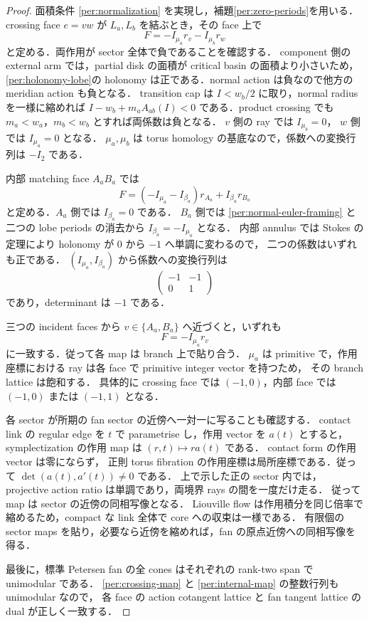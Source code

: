 \begin{proof}
面積条件 \eqref{per:normalization} を実現し，補題\ref{per:zero-periods}を用いる．
crossing face $e=vw$ が $L_a,L_b$ を結ぶとき，その face 上で
\begin{equation}\label{per:crossing-map}
 F=-I_{\mu_a}r_v-I_{\mu_b}r_w
\end{equation}
と定める．両作用が sector 全体で負であることを確認する．
component 側の external arm では，partial disk の面積が critical basin の面積より小さいため，
\eqref{per:holonomy-lobe}の holonomy は正である．normal action は負なので他方の meridian action も負となる．
transition cap は $I<w_b/2$ に取り，normal radius を一様に縮めれば
$I-w_b+m_a A_{ab}(I)<0$ である．product crossing でも $m_a<w_a$，$m_b<w_b$ とすれば両係数は負となる．
$v$ 側の ray では $I_{\mu_b}=0$，
$w$ 側では $I_{\mu_a}=0$ となる．
$\mu_a,\mu_b$ は torus homology の基底なので，係数への変換行列は $-I_2$ である．

内部 matching face $A_aB_a$ では
\begin{equation}\label{per:internal-map}
 F=(-I_{\mu_a}-I_{\beta_a})r_{A_a}+I_{\beta_a}r_{B_a}
\end{equation}
と定める．$A_a$ 側では $I_{\beta_a}=0$ である．
$B_a$ 側では \eqref{per:normal-euler-framing} と二つの lobe periods の消去から
$I_{\beta_a}=-I_{\mu_a}$ となる．
内部 annulus では Stokes の定理により holonomy が $0$ から $-1$ へ単調に変わるので，
二つの係数はいずれも正である．
$(I_{\mu_a},I_{\beta_a})$ から係数への変換行列は
\[
 \begin{pmatrix}-1&-1\\0&1\end{pmatrix}
\]
であり，determinant は $-1$ である．

三つの incident faces から $v\in\{A_a,B_a\}$ へ近づくと，いずれも
\begin{equation}\label{per:common-ray}
 F=-I_{\mu_a}r_v
\end{equation}
に一致する．従って各 map は branch 上で貼り合う．
$\mu_a$ は primitive で，作用座標における ray は各 face で primitive integer vector を持つため，
その branch lattice は飽和する．
具体的に crossing face では $(-1,0)$，内部 face では $(-1,0)$ または $(-1,1)$ となる．

各 sector が所期の fan sector の近傍へ一対一に写ることも確認する．
contact link の regular edge を $t$ で parametrise し，作用 vector を $a(t)$ とすると，
symplectization の作用 map は $(r,t)\mapsto r a(t)$ である．
contact form の作用 vector は零にならず\cite[Remark 2.11]{EM}，
正則 torus fibration の作用座標は局所座標である．従って
$\det(a(t),a'(t))\ne0$ である．
上で示した正の sector 内では，projective action ratio は単調であり，両境界 rays の間を一度だけ走る．
従って map は sector の近傍の同相写像となる．
Liouville flow は作用積分を同じ倍率で縮めるため，compact な link 全体で core への収束は一様である．
有限個の sector maps を貼り，必要なら近傍を縮めれば，fan の原点近傍への同相写像を得る．

最後に，標準 Petersen fan の全 cones はそれぞれの rank-two span で unimodular である．
\eqref{per:crossing-map} と \eqref{per:internal-map} の整数行列も unimodular なので，
各 face の action cotangent lattice と fan tangent lattice の dual が正しく一致する．
\end{proof}

